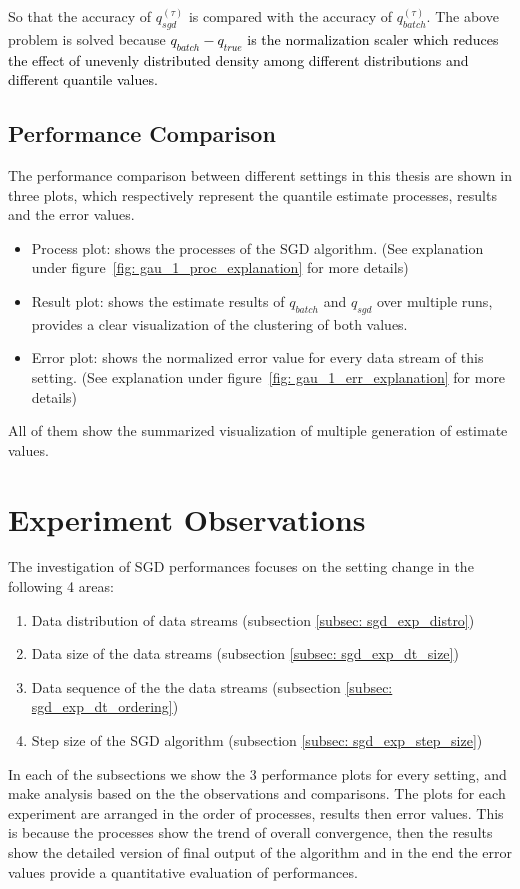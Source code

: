 So that the accuracy of $q_{sgd}^{(\tau)}$ is compared with the accuracy of $q_{batch}^{(\tau)}$. The above problem is solved because 
\textcolor{black}{
    $
    q_{batch} - q_{true}
    $
    is the normalization scaler which reduces the effect of unevenly distributed density among different distributions and different quantile values.
}

\subsection{Performance Comparison}
The performance comparison between different settings in this thesis are shown in three plots, which respectively represent
the quantile estimate processes, results and the error values.
\begin{itemize}
    \item Process plot: shows the processes of the SGD algorithm. (See explanation under figure~\ref{fig: gau_1_proc_explanation} for more details)
    \item Result plot: shows the estimate results of $q_{batch}$ and $q_{sgd}$ over multiple runs, provides a clear visualization of the clustering of both values.
    \item Error plot: shows the normalized error value for every data stream of this setting. (See explanation under figure~\ref{fig: gau_1_err_explanation} for more details)
\end{itemize}

All of them show the summarized visualization of multiple generation of estimate values.


\pagebreak
\section{Experiment Observations}
\label{sec: observations}

The investigation of SGD performances focuses on the setting change in the following 4 areas:
    \begin{enumerate}
        \item Data distribution of data streams (subsection \ref{subsec: sgd_exp_distro})
        \item Data size of the data streams (subsection \ref{subsec: sgd_exp_dt_size})
        \item Data sequence of the the data streams  (subsection \ref{subsec: sgd_exp_dt_ordering})
        \item Step size of the SGD algorithm (subsection \ref{subsec: sgd_exp_step_size})
    \end{enumerate}
In each of the subsections we show the 3 performance plots for every setting, and make analysis based on the the observations and comparisons. The plots for each experiment are arranged in the order of processes, results then error values. This is because the processes show the trend of overall convergence, then the results show the detailed version of final output of the algorithm and in the end the error values provide a quantitative evaluation of performances. 

